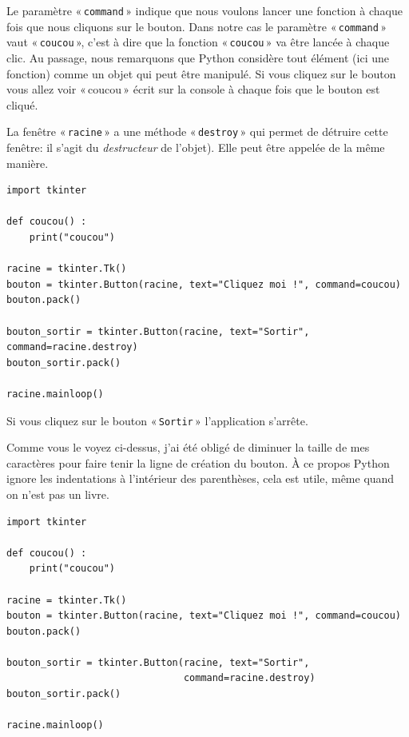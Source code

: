Le paramètre « \texttt{command} » indique que nous voulons lancer une fonction à chaque fois que nous cliquons sur le bouton. Dans notre cas le paramètre « \texttt{command} » vaut « \texttt{coucou} », c'est à dire que la fonction « \texttt{coucou} » va être lancée à chaque clic. Au passage, nous remarquons que Python considère tout élément (ici une fonction) comme un objet qui peut être manipulé. Si vous cliquez sur le bouton vous allez voir « coucou »  écrit sur la console à chaque fois que le bouton est cliqué.


La fenêtre « \texttt{racine} » a une méthode « \texttt{destroy} » qui permet de détruire cette fenêtre: il s'agit du \emph{destructeur} de l'objet). Elle peut être appelée de la même manière.

\begin{small}
\begin{Verbatim}[frame=single,rulecolor=\color{mbleu}, label=à taper]
import tkinter

def coucou() :
    print("coucou")

racine = tkinter.Tk()
bouton = tkinter.Button(racine, text="Cliquez moi !", command=coucou)
bouton.pack()

bouton_sortir = tkinter.Button(racine, text="Sortir", command=racine.destroy)
bouton_sortir.pack()

racine.mainloop()
\end{Verbatim}
\end{small}

Si vous cliquez sur le bouton « \texttt{Sortir} » l'application s'arrête.

Comme vous le voyez ci-dessus, j'ai été obligé de diminuer la taille de mes caractères pour faire tenir la ligne de création du bouton. À ce propos Python ignore les indentations à l'intérieur des parenthèses, cela est utile, même quand on n'est pas un livre. 

\begin{Verbatim}[frame=single,rulecolor=\color{gray}, label=ne pas saisir]
import tkinter

def coucou() :
    print("coucou")

racine = tkinter.Tk()
bouton = tkinter.Button(racine, text="Cliquez moi !", command=coucou)
bouton.pack()

bouton_sortir = tkinter.Button(racine, text="Sortir",
                               command=racine.destroy)
bouton_sortir.pack()

racine.mainloop()
\end{Verbatim}
 

